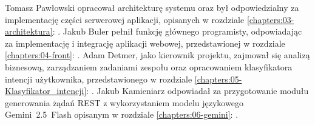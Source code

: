 	Tomasz Pawłowski opracował architekturę systemu oraz był odpowiedzialny za implementację części serwerowej aplikacji, opisanych w rozdziale \ref{chapters:03-architektura}: . Jakub Buler pełnił funkcję głównego programisty, odpowiadając za implementację i integrację aplikacji webowej, przedstawionej w rozdziale \ref{chapters:04-front}: . Adam Detmer, jako kierownik projektu, zajmował się analizą biznesową, zarządzaniem zadaniami zespołu oraz opracowaniem klasyfikatora intencji użytkownika, przedstawionego w rozdziale \ref{chapters:05-Klasyfikator_intencji}: . Jakub Kamieniarz odpowiadał za przygotowanie modułu generowania żądań REST z wykorzystaniem modelu językowego Gemini~2.5~Flash opisanym w rozdziale \ref{chapters:06-gemini}: .

	
